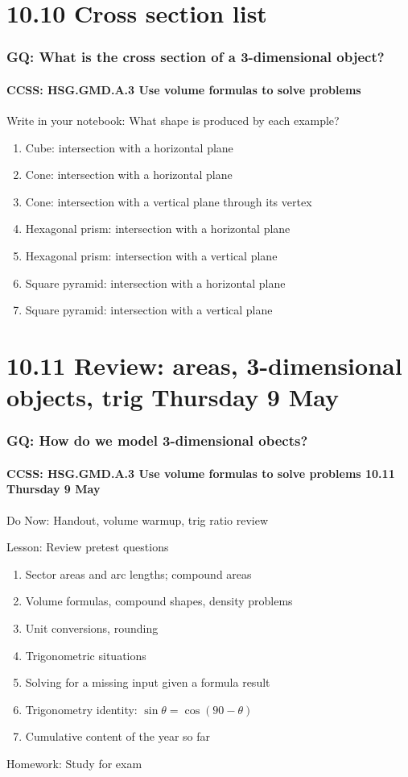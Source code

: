 \documentclass{beamer}
\begin{document}
  \section{10.10 Cross section list}
    \frame
    {
      \frametitle{GQ: What is the cross section of a 3-dimensional object?}
      \framesubtitle{CCSS: HSG.GMD.A.3 Use volume formulas to solve problems}
      \begin{block}{Write in your notebook: What shape is produced by each example?}
        \begin{enumerate}
          \item Cube: intersection with a horizontal plane
          \item Cone: intersection with a horizontal plane
          \item Cone: intersection with a vertical plane through its vertex
          \item Hexagonal prism: intersection with a horizontal plane
          \item Hexagonal prism: intersection with a vertical plane
          \item Square pyramid: intersection with a horizontal plane
          \item Square pyramid: intersection with a vertical plane
      \end{enumerate}
      \end{block}

    }

  \section{10.11 Review: areas, 3-dimensional objects, trig Thursday 9 May}
    \frame
    {
      \frametitle{GQ: How do we model 3-dimensional obects?}
      \framesubtitle{CCSS: HSG.GMD.A.3 Use volume formulas to solve problems \hfill \alert{10.11 Thursday 9 May}}

      Do Now: Handout, volume warmup, trig ratio review
      \begin{block}{Lesson: Review pretest questions}
        \begin{enumerate}
          \item Sector areas and arc lengths; compound areas
          \item Volume formulas, compound shapes, density problems
          \item Unit conversions, rounding
          \item Trigonometric situations
          \item Solving for a missing input given a formula result
          \item Trigonometry identity: $\sin \theta = \cos (90-\theta)$
          \item Cumulative content of the year so far
      \end{enumerate}
      \end{block}
      Homework: Study for exam
    }
\end{document}
